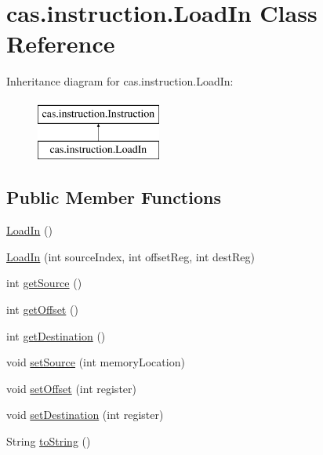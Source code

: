 \hypertarget{classcas_1_1instruction_1_1_load_in}{\section{cas.\-instruction.\-Load\-In Class Reference}
\label{classcas_1_1instruction_1_1_load_in}
}
Inheritance diagram for cas.\-instruction.\-Load\-In\-:\begin{figure}[H]
\begin{center}
\leavevmode
\includegraphics[height=2.000000cm]{classcas_1_1instruction_1_1_load_in}
\end{center}
\end{figure}
\subsection*{Public Member Functions}
\begin{DoxyCompactItemize}
\item 
\hyperlink{classcas_1_1instruction_1_1_load_in_a047b0ba4c79c574bd1e6752c8f4a1388}{Load\-In} ()
\item 
\hyperlink{classcas_1_1instruction_1_1_load_in_acee6f54813789963b35b995ea82a56b3}{Load\-In} (int source\-Index, int offset\-Reg, int dest\-Reg)
\item 
int \hyperlink{classcas_1_1instruction_1_1_load_in_ae9ceefd2aa26cf50289fd57f4dabe790}{get\-Source} ()
\item 
int \hyperlink{classcas_1_1instruction_1_1_load_in_a224ec4b85db568b4a2605f9533adaa51}{get\-Offset} ()
\item 
int \hyperlink{classcas_1_1instruction_1_1_load_in_a368ea01ce4dcda9bba15e501283439ca}{get\-Destination} ()
\item 
void \hyperlink{classcas_1_1instruction_1_1_load_in_a9d173070b68fcb6aea046c09a368e6b7}{set\-Source} (int memory\-Location)
\item 
void \hyperlink{classcas_1_1instruction_1_1_load_in_a8ce9a43f8e44f9e0b8edf3b1d7c654c4}{set\-Offset} (int register)
\item 
void \hyperlink{classcas_1_1instruction_1_1_load_in_a2547e43f950df15508488ce2b6013be9}{set\-Destination} (int register)
\item 
String \hyperlink{classcas_1_1instruction_1_1_load_in_acb274bbffd7439a3eba255ce1e793770}{to\-String} ()
\end{DoxyCompactItemize}


